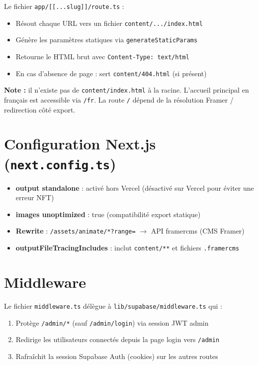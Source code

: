 \documentclass[11pt,a4paper]{report}
\begin{document}
Le fichier \texttt{app/[[...slug]]/route.ts} :
\begin{itemize}[leftmargin=*]
  \item Résout chaque URL vers un fichier \texttt{content/.../index.html}
  \item Génère les paramètres statiques via \texttt{generateStaticParams}
  \item Retourne le HTML brut avec \texttt{Content-Type: text/html}
  \item En cas d'absence de page : sert \texttt{content/404.html} (si présent)
\end{itemize}

\textbf{Note :} il n'existe pas de \texttt{content/index.html} à la racine. L'accueil principal en français est accessible via \texttt{/fr}. La route \texttt{/} dépend de la résolution Framer / redirection côté export.

\section{Configuration Next.js (\texttt{next.config.ts})}

\begin{itemize}[leftmargin=*]
  \item \textbf{output standalone} : activé hors Vercel (désactivé sur Vercel pour éviter une erreur NFT)
  \item \textbf{images unoptimized} : true (compatibilité export statique)
  \item \textbf{Rewrite} : \texttt{/assets/animate/*?range=} $\rightarrow$ API framercms (CMS Framer)
  \item \textbf{outputFileTracingIncludes} : inclut \texttt{content/**} et fichiers \texttt{.framercms}
\end{itemize}

\section{Middleware}

Le fichier \texttt{middleware.ts} délègue à \texttt{lib/supabase/middleware.ts} qui :
\begin{enumerate}[leftmargin=*]
  \item Protège \texttt{/admin/*} (sauf \texttt{/admin/login}) via session JWT admin
  \item Redirige les utilisateurs connectés depuis la page login vers \texttt{/admin}
  \item Rafraîchit la session Supabase Auth (cookies) sur les autres routes
\end{enumerate}
\end{document}
